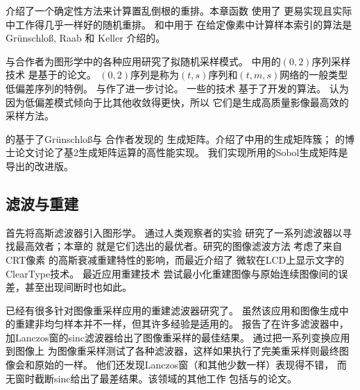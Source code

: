 \citet{FAURE199247}介绍了一个确定性方法来计算置乱倒根的重排。本章函数
使用了
更易实现且实际中工作得几乎一样好的随机重排。
和中用于
在给定像素中计算样本索引的算法是Gr\"{u}nschlo\ss{}, Raab 和 Keller
\parencite*{10.1007/978-3-642-27440-4_21}介绍的。

\citet{10.1007/978-3-7091-7484-5_11,10.1145/258734.258769,Keller03strictlydeterministic}
与合作者为图形学中的各种应用研究了拟随机采样模式。
中用的$(0,2)$序列采样技术
是基于\citet{10.1111/1467-8659.00706}的论文。
$(0,2)$序列是称为$(t,s)$序列和$(t,m,s)$网络的一般类型低偏差序列的特例。
\citet{10.1137/1.9781611970081}与\citet{dick_pillichshammer_2010}作了进一步讨论。
一些\citet{10.1111/1467-8659.00706}的技术
基于了\citet{10.1007/978-3-642-56046-0_17}开发的算法。
\citet{Keller03strictlydeterministic}
认为因为低偏差模式倾向于比其他收敛得更快，所以
它们是生成高质量影像最高效的采样方法。

的基于了Gr\"{u}nschlo\ss{}与
合作者\parencite*{10.1007/978-3-642-04107-5_25,10.1007/978-3-540-74496-2_23}发现的
生成矩阵。\citet{SOBOL196786}介绍了中用的生成矩阵簇；
\citet{Wächter_2008}的博士论文讨论了基2生成矩阵运算的高性能实现。
我们实现所用的Sobol生成矩阵是\citet{10.1137/070709359}导出的改进版。

\subsection{滤波与重建}\label{sub:滤波与重建}
\citet{10.1145/7529.8927}首先将高斯滤波器引入图形学。
\citet{10.1145/54852.378514}通过人类观察者的实验
研究了一系列滤波器以寻找最高效者；本章的
就是它们选出的最优者。\citet{10.1145/800224.806784}研究的图像滤波方法
考虑了来自CRT像素
的高斯衰减重建特性的影响，而最近\citet{10.1889/1.1832941}介绍了
微软在LCD上显示文字的ClearType技术。
\citet{10.5555/2532129.2532161}最近应用重建技术
尝试最小化重建图像与原始连续图像间的误差，甚至出现间断时也如此。

已经有很多针对图像重采样应用的重建滤波器研究了。
虽然该应用和图像生成中的重建非均匀样本并不一样，但其许多经验是适用的。
\citet{10.5555/90767.90805}报告了在许多滤波器中，
加Lanczos窗的sinc滤波器给出了图像重采样的最佳结果。
\citet{10.1007/10704282_23}通过把一系列变换应用到图像上
为图像重采样测试了各种滤波器，这样如果执行了完美重采样则最终图像会和原始的一样。
他们还发现Lanczos窗（和其他少数一样）表现得不错，
而无窗时截断sinc给出了最差结果。该领域的其他工作
包括\citet{597800}与\citet{556504}的论文。

